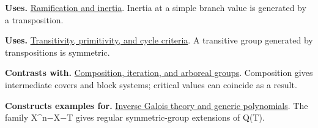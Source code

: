 \documentclass[11pt,a4paper,oneside,openany]{book}
\begin{document}
\color{black}\textbf{Uses.} \hyperlink{article:ramification-inertia}{Ramification and inertia}. Inertia at a simple branch value is generated by a transposition.\par
\color{black}\textbf{Uses.} \hyperlink{article:permutation-groups}{Transitivity, primitivity, and cycle criteria}. A transitive group generated by transpositions is symmetric.\par
\color{black}\textbf{Contrasts with.} \hyperlink{article:composition-iteration}{Composition, iteration, and arboreal groups}. Composition gives intermediate covers and block systems; critical values can coincide as a result.\par
\color{black}\textbf{Constructs examples for.} \hyperlink{article:inverse-galois}{Inverse Galois theory and generic polynomials}. The family X\textasciicircum{}n\ensuremath{-}X\ensuremath{-}T gives regular symmetric-group extensions of Q(T).\par
\endgroup
\end{document}

